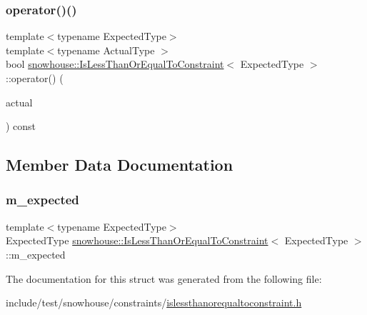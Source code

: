 \subsubsection{\texorpdfstring{operator()()}{operator()()}}
{\footnotesize\ttfamily template$<$typename Expected\+Type$>$ \\
template$<$typename Actual\+Type $>$ \\
bool \mbox{\hyperlink{structsnowhouse_1_1IsLessThanOrEqualToConstraint}{snowhouse\+::\+Is\+Less\+Than\+Or\+Equal\+To\+Constraint}}$<$ Expected\+Type $>$\+::operator() (\begin{DoxyParamCaption}\item[{const Actual\+Type \&}]{actual }\end{DoxyParamCaption}) const\hspace{0.3cm}{\ttfamily [inline]}}



\subsection{Member Data Documentation}
\mbox{\label{structsnowhouse_1_1IsLessThanOrEqualToConstraint_a1f36ca48b4deb7336c258994e14016d8}} 
\subsubsection{\texorpdfstring{m\_expected}{m\_expected}}
{\footnotesize\ttfamily template$<$typename Expected\+Type$>$ \\
Expected\+Type \mbox{\hyperlink{structsnowhouse_1_1IsLessThanOrEqualToConstraint}{snowhouse\+::\+Is\+Less\+Than\+Or\+Equal\+To\+Constraint}}$<$ Expected\+Type $>$\+::m\+\_\+expected}



The documentation for this struct was generated from the following file\+:\begin{DoxyCompactItemize}
\item 
include/test/snowhouse/constraints/\mbox{\hyperlink{islessthanorequaltoconstraint_8h}{islessthanorequaltoconstraint.\+h}}\end{DoxyCompactItemize}
